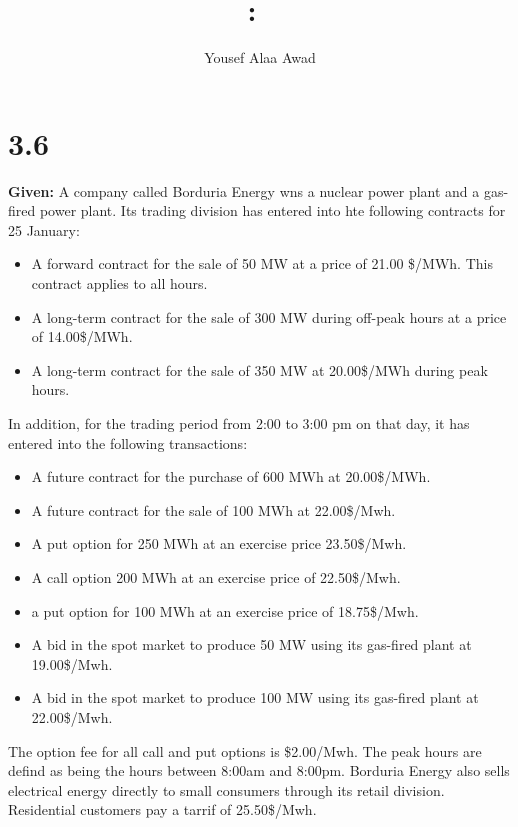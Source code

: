 \documentclass{article}
\title{
    \vspace{2in}
    \textmd{\textbf{\hmwkClass:\ \hmwkTitle}}\\
    \normalsize\vspace{0.1in}
    \vspace{3in}
}
\author{Yousef Alaa Awad}
\begin{document}
\maketitle
\pagebreak

\section{3.6}
\textbf{Given:} A company called Borduria Energy wns a nuclear power plant and a gas-fired power plant. Its trading division has entered into hte following contracts for 25 January:
\begin{itemize}
	\item A forward contract for the sale of 50 MW at a price of 21.00 \$/MWh. This contract applies to all hours.
	\item A long-term contract for the sale of 300 MW during off-peak hours at a price of 14.00\$/MWh.
	\item A long-term contract for the sale of 350 MW at 20.00\$/MWh during peak hours.
\end{itemize}
In addition, for the trading period from 2:00 to 3:00 pm on that day, it has entered into the following transactions:
\begin{itemize}
	\item A future contract for the purchase of 600 MWh at 20.00\$/MWh.
	\item A future contract for the sale of 100 MWh at 22.00\$/Mwh.
	\item A put option for 250 MWh at an exercise price 23.50\$/Mwh.
	\item A call option 200 MWh at an exercise price of 22.50\$/Mwh.
	\item a put option for 100 MWh  at an exercise price of 18.75\$/Mwh.
	\item A bid in the spot market to produce 50 MW using its gas-fired plant at 19.00\$/Mwh.
	\item A bid in the spot market to produce 100 MW using its gas-fired plant at 22.00\$/Mwh.
\end{itemize}
The option fee for all call and put options is \$2.00/Mwh. The peak hours are defind as being the hours between 8:00am and 8:00pm. Borduria Energy also sells electrical energy directly to small consumers through its retail division. Residential customers pay a tarrif of 25.50\$/Mwh.

\pagebreak
\end{document}

